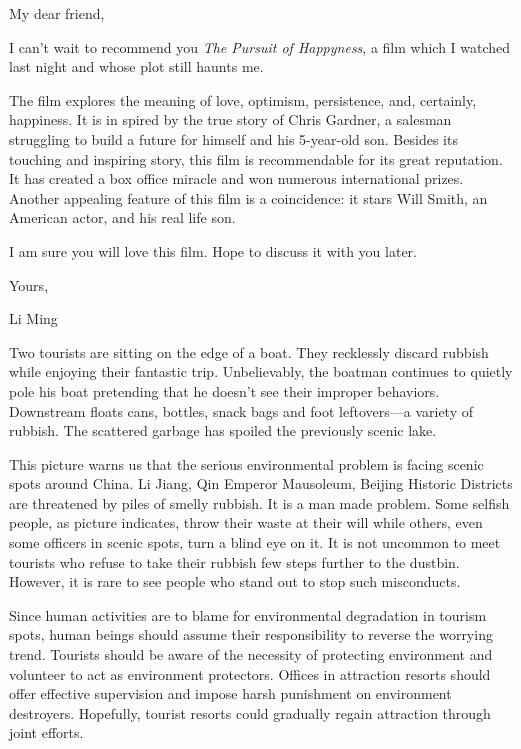 My dear friend,

I can't wait to recommend you \emph{The Pursuit of Happyness}, a film which I watched last night and whose plot still haunts me.

The film explores the meaning of love, optimism, persistence, and, certainly, happiness. It is in spired by the true story of Chris Gardner, a salesman struggling to build a future for himself and his 5-year-old son. Besides its touching and inspiring story, this film is recommendable for its great reputation. It has created a box office miracle and won numerous international prizes. Another appealing feature of this film is a coincidence: it stars Will Smith, an American actor, and his real life son.

I am sure you will love this film. Hope to discuss it with you later.

\begin{flushright}Yours,

Li Ming\end{flushright}

Two tourists are sitting on the edge of a boat. They recklessly discard rubbish while enjoying their fantastic trip. Unbelievably, the boatman continues to quietly pole his boat pretending that he doesn't see their improper behaviors. Downstream floats cans, bottles, snack bags and foot leftovers---a variety of rubbish. The scattered garbage has spoiled the previously scenic lake.

This picture warns us that the serious environmental problem is facing scenic spots around China. Li Jiang, Qin Emperor Mausoleum, Beijing Historic Districts are threatened by piles of smelly rubbish. It is a man made problem. Some selfish people, as picture indicates, throw their waste at their will while others, even some officers in scenic spots, turn a blind eye on it. It is not uncommon to meet tourists who refuse to take their rubbish few steps further to the dustbin. However, it is rare to see people who stand out to stop such misconducts.

Since human activities are to blame for environmental degradation in tourism spots, human beings should assume their responsibility to reverse the worrying trend. Tourists should be aware of the necessity of protecting environment and volunteer to act as environment protectors. Offices in attraction resorts should offer effective supervision and impose harsh punishment on environment destroyers. Hopefully, tourist resorts could gradually regain attraction through joint efforts.